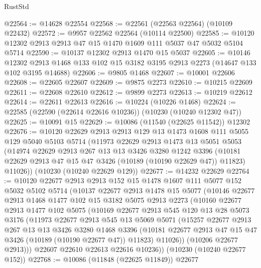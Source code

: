 \begin{lexlean}{RustStd}
\begin{coremodule}
@22564 := @14628 @22554
@22568 := @22561 (@22563 @22564) (@10109 @22432)
@22572 := @9957 @22562 @22564 (@10114 @22500)
@22585 := @10120 @12302 @2913 @2913 @47 @15 @1470 @1609 @111 @5037 @47 @5032 @5104 @5714
@22590 := @10137 @12302 @2913 @1470 @15 @5037
@22605 := @10146
    @12302
    @2913
    @1468
    @133
    @102
    @15
    @3182
    @3195
    @2913
    @2273
    (@14647 @133 @102 @3195 @14688)
@22606 := @9805 @1468
@22607 := @10001 @22606
@22608 := @22605 @22607
@22609 := @9875 @2273
@22610 := @10215 @22609
@22611 := @22608 @22610
@22612 := @9899 @2273
@22613 := @10219 @22612
@22614 := @22611 @22613
@22616 := @10224 (@10226 @1468)
@22624 := @22585 (@22590 (@22614 @22616 @10236)) (@10230 (@10240 @12302 @47))
@22625 := @10091 @15
@22629 := @10086 (@11540 (@22625 @11542)) @12302
@22676 := @10120
    @22629
    @2913
    @2913
    @129
    @13
    @1473
    @1608
    @111
    @5055
    @129
    @5040
    @5103
    @5714
    (@11973
      @22629
      @2913
      @1473
      @13
      @5051
      @5053
      (@14974
        @22629
        @2913
        @267
        @13
        @13
        @3426
        @3280
        @1242
        @3396
        (@10181 @22629 @2913 @47 @15 @47 @3426 (@10189 (@10190 @22629 @47)) @11823)
        @11026))
    (@10230 (@10240 @22629 @129))
@22677 := @14232 @22629
@22764 := @10120
    @22677
    @2913
    @2913
    @152
    @15
    @1478
    @1607
    @111
    @5077
    @152
    @5032
    @5102
    @5714
    (@10137
      @22677
      @2913
      @1478
      @15
      @5077
      (@10146
        @22677
        @2913
        @1468
        @1477
        @102
        @15
        @3182
        @5075
        @2913
        @2273
        (@10160
          @22677
          @2913
          @1477
          @102
          @5075
          (@10169
            @22677
            @2913
            @545
            @120
            @13
            @28
            @5073
            @3176
            (@11973
              @22677
              @2913
              @545
              @13
              @5069
              @5071
              (@15257
                @22677
                @2913
                @267
                @13
                @13
                @3426
                @3280
                @1468
                @3396
                (@10181 @22677 @2913 @47 @15 @47 @3426 (@10189 (@10190 @22677 @47)) @11823)
                @11026))
            (@10206 @22677 @2913)))
        @22607
        @22610
        @22613
        @22616
        @10236))
    (@10230 (@10240 @22677 @152))
@22768 := @10086 (@11848 (@22625 @11849)) @22677

\end{coremodule}
\end{lexlean}
